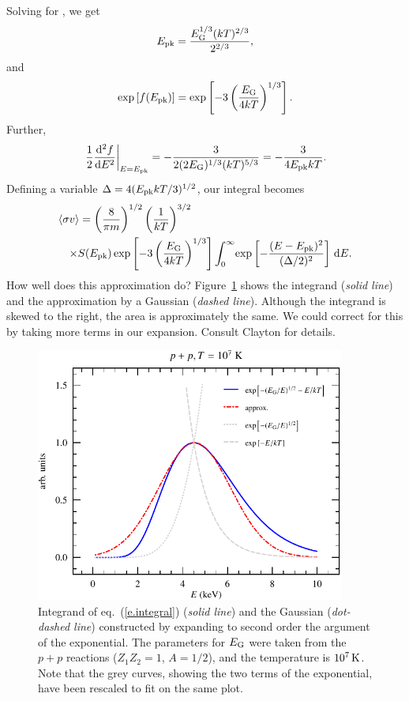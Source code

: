 Solving for \Epk, we get
\[
E_{\mathrm{pk}} = \frac{E_{\mathrm{G}}^{1/3}(kT)^{2/3}}{2^{2/3}},
\]
and 
\[ \exp\left[f(E_{\mathrm{pk}})\right] = \exp\left[-3\left(\frac{E_{\mathrm{G}}}{4kT}\right)^{1/3}\right].
\]
Further,
\[
\left.\frac{1}{2}\frac{\mathrm{d}^{2}f}{\mathrm{d} E^{2}}\right|_{E=E_{\mathrm{pk}}} = -\frac{3}{2(2E_{\mathrm{G}})^{1/3}(kT)^{5/3}} = -\frac{3}{4E_{\mathrm{pk}} kT}.
\]
Defining a variable $\Delta = 4(E_{\mathrm{pk}} kT/3)^{1/2}$, our integral becomes
\begin{eqnarray}\label{e.integral2}
\lefteqn{\langle\sigma v\rangle = \left(\frac{8}{\pi m}\right)^{1/2}\left(\frac{1}{kT}\right)^{3/2}}\nonumber\\
&&\times S(\Epk)
  \exp\left[-3\left(\frac{\EG}{4kT}\right)^{1/3}\right]
  \int_{0}^{\infty}\!\exp\left[-\frac{(E-\Epk)^{2}}{(\Delta/2)^{2}}\right]\,\dif E.
\end{eqnarray}
How well does this approximation do?  Figure~\ref{f.integrand} shows the integrand (\emph{solid line}) and the approximation by a Gaussian (\emph{dashed line}).  Although the integrand is skewed to the right, the area is approximately the same.  We could correct for this by taking more terms in our expansion. Consult Clayton for details.

\begin{figure}[htbp]
\includegraphics[width=4in]{Figures/plots_out/coulomb_integrand}
\caption{Integrand of eq.~(\protect\ref{e.integral}) (\emph{solid line}) and the Gaussian (\emph{dot-dashed line}) constructed by expanding to second order the argument of the exponential. The parameters for $E_{\mathrm{G}}$ were taken from the $p+p$ reactions ($Z_{1}Z_{2}=1$, $A = 1/2$), and the temperature is $10^{7}\,\mathrm{K}$.  Note that the grey curves, showing the two terms of the exponential, have been rescaled to fit on the same plot.}
\label{f.integrand}
\end{figure}

